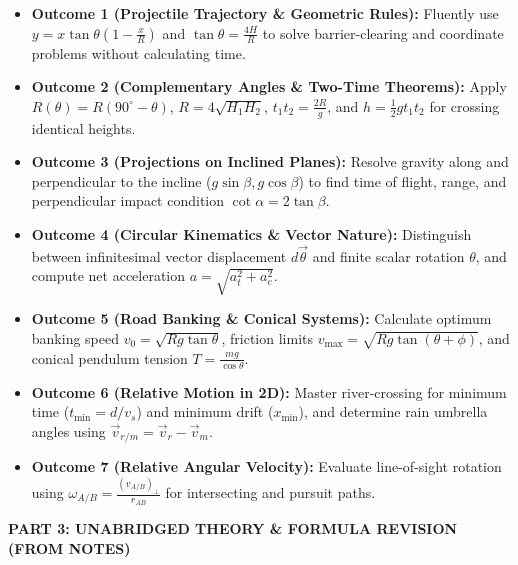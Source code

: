\documentclass[11pt,a4paper]{article}
\begin{document}
\begin{itemize}[leftmargin=18pt,itemsep=2.5pt,topsep=1pt]
  \item[$\square$] \textbf{\textcolor{primaryDark}{Outcome 1 (Projectile Trajectory \& Geometric Rules):}} Fluently use $y = x\tan\theta\left(1 - \frac{x}{R}\right)$ and $\tan\theta = \frac{4H}{R}$ to solve barrier-clearing and coordinate problems without calculating time.
  \item[$\square$] \textbf{\textcolor{primaryDark}{Outcome 2 (Complementary Angles \& Two-Time Theorems):}} Apply $R(\theta) = R(90^\circ - \theta)$, $R = 4\sqrt{H_1 H_2}$, $t_1 t_2 = \frac{2R}{g}$, and $h = \frac{1}{2}gt_1 t_2$ for crossing identical heights.
  \item[$\square$] \textbf{\textcolor{primaryDark}{Outcome 3 (Projections on Inclined Planes):}} Resolve gravity along and perpendicular to the incline ($g\sin\beta, g\cos\beta$) to find time of flight, range, and perpendicular impact condition $\cot\alpha = 2\tan\beta$.
  \item[$\square$] \textbf{\textcolor{primaryDark}{Outcome 4 (Circular Kinematics \& Vector Nature):}} Distinguish between infinitesimal vector displacement $d\vec{\theta}$ and finite scalar rotation $\theta$, and compute net acceleration $a = \sqrt{a_t^2 + a_c^2}$.
  \item[$\square$] \textbf{\textcolor{primaryDark}{Outcome 5 (Road Banking \& Conical Systems):}} Calculate optimum banking speed $v_0 = \sqrt{Rg\tan\theta}$, friction limits $v_{\max} = \sqrt{Rg\tan(\theta + \phi)}$, and conical pendulum tension $T = \frac{mg}{\cos\theta}$.
  \item[$\square$] \textbf{\textcolor{primaryDark}{Outcome 6 (Relative Motion in 2D):}} Master river-crossing for minimum time ($t_{\min} = d/v_s$) and minimum drift ($x_{\min}$), and determine rain umbrella angles using $\vec{v}_{r/m} = \vec{v}_r - \vec{v}_m$.
  \item[$\square$] \textbf{\textcolor{primaryDark}{Outcome 7 (Relative Angular Velocity):}} Evaluate line-of-sight rotation using $\omega_{A/B} = \frac{(v_{A/B})_\perp}{r_{AB}}$ for intersecting and pursuit paths.
\end{itemize}

\vspace{5pt}

\begin{tcolorbox}[sectionbanner]
  {\large \textbf{\textsf{PART 3: UNABRIDGED THEORY \& FORMULA REVISION (FROM NOTES)}}}
\end{tcolorbox}
\vspace{4pt}
\end{document}
